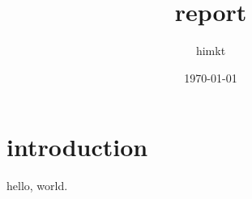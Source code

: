\documentclass[twocolumn]{article}
\title{report}
\author{himkt}
\date{\today}
\begin{document}
\maketitle
\section{introduction}
hello, world\cite{greenwade93}.



\end{document}
